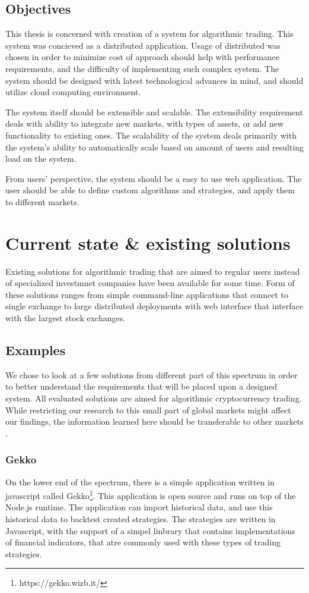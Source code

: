 \section{Objectives}
This thesis is concerned with creation of a system for algorithmic trading. This system was concieved
as a distributed application. Usage of distributed was chosen in order to minimize cost of
approach should help with performance requirements,
and the difficulty of implementing such complex system. The system should be designed with latest technological advances in mind, and
should utilize cloud computing environment.

The system itself should be extensible and scalable. The extensibility requirement deals with ability to integrate new markets,
with types of assets, or add new functionality to existing ones. The scalability of the system deals primarily with the system's
ability to automatically scale based on amount of users and resulting load on the system.

From users' perspective, the system should be a easy to use web application. The user should be able to define custom
algorithms and strategies, and apply them to different markets.

\chapter{Current state \& existing solutions}
\label{chapter:current_state}
Existing solutions for algorithmic trading that are aimed to regular users instead of specialized investmnet companies
have been available for some time. Form of these solutions ranges from simple command-line applications  that connect to single exchange
to large distributed deployments with web interface that interface with the largest stock exchanges\cite{Agopyan_financialbusiness}.

\section{Examples}
We chose to look at a few solutions from different part of this spectrum in order to better understand the requirements
that will be placed upon a designed system. All evaluated solutions are aimed for algorithmic cryptocurrency trading. While
restricting our research to this small part of global markets might affect our findings, the information learned here
should be transferable to other markets .

\subsection{Gekko}
On the lower end of the spectrum, there is a simple application written in javascript called Gekko\footnote{https://gekko.wizb.it/}.
This application is open source and runs on top of the Node.js runtime. The application can import historical data,
and use this historical data to backtest created strategies. The strategies are written in Javascript, with the support
of a simpel linbrary that contains implementations of financial indicators, that atre commonly used  with these types
of trading strategies.

